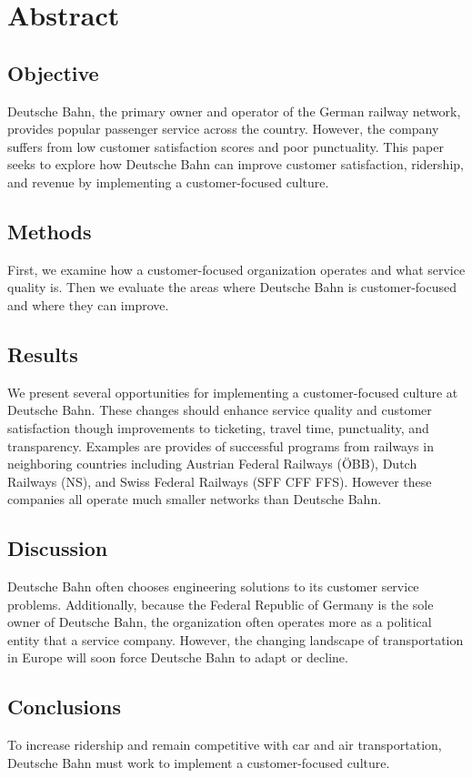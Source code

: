 \documentclass{article}
\begin{document}

\tableofcontents
\newpage

\section{Abstract}
\subsection*{Objective}
Deutsche Bahn, the primary owner and operator of the German railway network, provides popular passenger service across the country. However, the company suffers from low customer satisfaction scores and poor punctuality. This paper seeks to explore how Deutsche Bahn can improve customer satisfaction, ridership, and revenue by implementing a customer-focused culture. 
\subsection*{Methods}
First, we examine how a customer-focused organization operates and what service quality is. Then we evaluate the areas where Deutsche Bahn is customer-focused and where they can improve. 
\subsection*{Results}
We present several opportunities for implementing a customer-focused culture at Deutsche Bahn. These changes should enhance service quality and customer satisfaction though improvements to ticketing, travel time, punctuality, and transparency. Examples are provides of successful programs from railways in neighboring countries including Austrian Federal Railways (ÖBB), Dutch Railways (NS), and Swiss Federal Railways (SFF CFF FFS). However these companies all operate much smaller networks than Deutsche Bahn.
\subsection*{Discussion}
Deutsche Bahn often chooses engineering solutions to its customer service problems. Additionally, because the Federal Republic of Germany is the sole owner of Deutsche Bahn, the organization often operates more as a political entity that a service company. However, the changing landscape of transportation in Europe will soon force Deutsche Bahn to adapt or decline.
\subsection*{Conclusions}
To increase ridership and remain competitive with car and air transportation, Deutsche Bahn must work to implement a customer-focused culture.
\newpage
\end{document}
